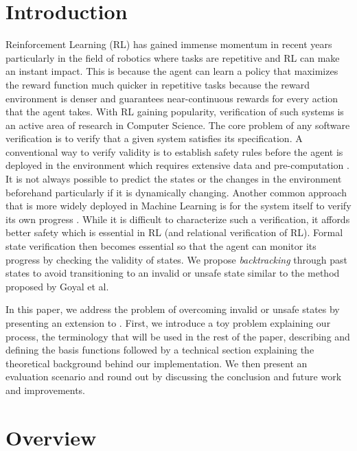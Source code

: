 \documentclass[acmsmall,review,authorversion]{acmart}
\begin{document}
\section{Introduction}
\label{section:intro}
Reinforcement Learning (RL) has gained immense momentum in recent years particularly in the field of robotics where tasks are repetitive and RL can make an instant impact. This is because the agent can learn a policy that maximizes the reward function much quicker in repetitive tasks because the reward environment is denser and guarantees near-continuous rewards for every action that the agent takes. With RL gaining popularity, verification of such systems is an active area of research in Computer Science. The core problem of any software verification is to verify that a given system satisfies its specification. A conventional way to verify validity is to establish safety rules before the agent is deployed in the environment which requires extensive data and pre-computation \cite{gopinath:2017}. It is not always possible to predict the states or the changes in the environment beforehand particularly if it is dynamically changing. Another common approach that is more widely deployed in Machine Learning is for the system itself to verify its own progress \cite{zhu:2019,sun:2019}. While it is difficult to characterize such a verification, it affords better safety which is essential in RL (and relational verification of RL). Formal state verification then becomes essential so that the agent can monitor its progress by checking the validity of states. We propose \emph{backtracking} through past states to avoid transitioning to an invalid or unsafe state similar to the method proposed by Goyal et al. \cite{DBLP:journals/corr/abs-1804-00379}

In this paper, we address the problem of overcoming invalid or unsafe states by presenting an extension to \cite{zhu:2019}. First, we introduce a toy problem explaining our process, the terminology that will be used in the rest of the paper, describing and defining the basis functions followed by a technical section explaining the theoretical background behind our implementation. We then present an evaluation scenario and round out by discussing the conclusion and future work and improvements.

\section{Overview}
\label{section:overview}

    
    
\end{document}
